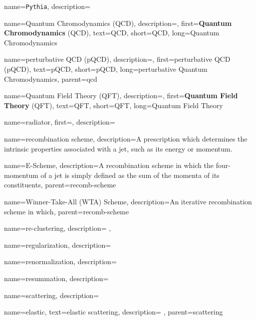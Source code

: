 {
  name=\texttt{Pythia},
  description={}
}

{
    name=Quantum Chromodynamics (QCD),
    description={},
    first={\textbf{Quantum Chromodynamics} (QCD)},
    text={QCD},
    short={QCD},
    long={Quantum Chromodynamics}
}

    {
        name=perturbative QCD (pQCD),
        description={},
        first={perturbative QCD (pQCD)},
        text={pQCD},
        short={pQCD},
        long={perturbative Quantum Chromodynamics},
        parent=qcd
    }



{
    name=Quantum Field Theory (QFT),
    description={},
    first={\textbf{Quantum Field Theory} (QFT)},
    text={QFT},
    short={QFT},
    long={Quantum Field Theory}
}


{
  name=radiator,
  first=,
  description={}
}


{
  name=recombination scheme,
  description={A prescription which determines the intrinsic properties associated with a jet, such as its energy or momentum.}
}

{
  name=E-Scheme,
  description={A recombination scheme in which the four-momentum of a jet is simply defined as the sum of the momenta of its constituents},
  parent=recomb-scheme
}


{
  name=Winner-Take-All (WTA) Scheme,
  description={An iterative recombination scheme in which},
  parent=recomb-scheme
}


{
    name=re-clustering,
    description={
    },
}


{
  name=regularization,
  description={}
}

{
  name=renormalization,
  description={}
}


{
  name=resummation,
  description={}
}



{
    name=scattering,
    description={
    }
}

{
    name=elastic,
    text=elastic scattering,
    description={
    },
    parent=scattering
}

